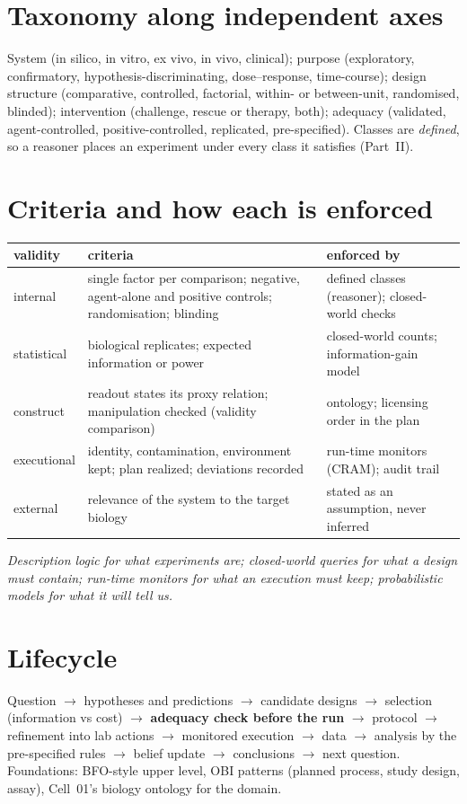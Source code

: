 \documentclass[10pt,a4paper]{article}
\begin{document}
\section*{Taxonomy along independent axes}
System (in silico, in vitro, ex vivo, in vivo, clinical); purpose (exploratory, confirmatory, hypothesis-discriminating,
dose--response, time-course); design structure (comparative, controlled, factorial, within- or between-unit,
randomised, blinded); intervention (challenge, rescue or therapy, both); adequacy (validated, agent-controlled,
positive-controlled, replicated, pre-specified). Classes are \emph{defined}, so a reasoner places an experiment under
every class it satisfies (Part~II).

\section*{Criteria and how each is enforced}
{\small\begin{tabularx}{\linewidth}{@{}>{\raggedright\arraybackslash}p{2.2cm}>{\raggedright\arraybackslash}X>{\raggedright\arraybackslash}p{4.6cm}@{}}\toprule
validity & criteria & enforced by \\ \midrule
internal & single factor per comparison; negative, agent-alone and positive controls; randomisation; blinding & defined classes (reasoner); closed-world checks \\
statistical & biological replicates; expected information or power & closed-world counts; information-gain model \\
construct & readout states its proxy relation; manipulation checked (validity comparison) & ontology; licensing order in the plan \\
executional & identity, contamination, environment kept; plan realized; deviations recorded & run-time monitors (CRAM); audit trail \\
external & relevance of the system to the target biology & stated as an assumption, never inferred \\
\bottomrule\end{tabularx}}

\emph{Description logic for what experiments are; closed-world queries for what a design must contain; run-time monitors
for what an execution must keep; probabilistic models for what it will tell us.}

\section*{Lifecycle}
Question $\rightarrow$ hypotheses and predictions $\rightarrow$ candidate designs $\rightarrow$ selection (information vs
cost) $\rightarrow$ \textbf{adequacy check before the run} $\rightarrow$ protocol $\rightarrow$ refinement into lab actions
$\rightarrow$ monitored execution $\rightarrow$ data $\rightarrow$ analysis by the pre-specified rules $\rightarrow$ belief
update $\rightarrow$ conclusions $\rightarrow$ next question. Foundations: BFO-style upper level, OBI patterns (planned
process, study design, assay), Cell~01's biology ontology for the domain.
\end{document}
